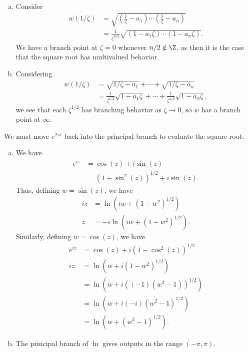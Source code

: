 \documentclass[10pt]{mypackage}
\begin{document}
\begin{solution}[19.18]\hfill
  \begin{enumerate}[(a)]
    \item Consider
      \begin{align*}
        w(1/\zeta) &= \sqrt{\left( \frac{1}{\zeta}-a_1 \right) \cdots \left( \frac{1}{\zeta}-a_n \right)}\\
               &= \frac{1}{\zeta^{n/2}}\sqrt{\left( 1-a_1\zeta \right)\cdots \left( 1-a_n \zeta \right)}.
      \end{align*}
      We have a branch point at $\zeta = 0$ whenever $n/2\notin \Z$, as then it is the case that the square root has multivalued behavior.
    \item Considering
      \begin{align*}
        w\left( 1/\zeta \right) &= \sqrt{1/\zeta - a_1} + \cdots + \sqrt{1/\zeta - a_n}\\
                                &= \frac{1}{\zeta^{1/2}}\sqrt{1-a_1\zeta} + \cdots + \frac{1}{\zeta^{1/2}}\sqrt{1-a_n\zeta},
      \end{align*}
      we see that each $\zeta^{1/2}$ has branching behavior as $ \zeta\rightarrow 0 $, so $w$ has a branch point at $\infty$.
  \end{enumerate}
\end{solution}
\begin{solution}[19.24]
  We must move $e^{2\pi i}$ back into the principal branch to evaluate the square root.
\end{solution}
\begin{solution}[19.28]\hfill
  \begin{enumerate}[(a)]
    \item We have
      \begin{align*}
        e^{iz} &= \cos(z) + i\sin(z)\\
               &= \left( 1-\sin^2(z) \right)^{1/2} + i\sin(z).
      \end{align*}
      Thus, defining $w = \sin(z)$, we have
      \begin{align*}
        iz &= \ln\left( iw + \left( 1- w^2\right)^{1/2} \right)\\
        z &= -i\ln\left( iw + \left( 1-w^2 \right)^{1/2} \right).
      \end{align*}
      Similarly, defining $w = \cos(z)$, we have
      \begin{align*}
        e^{iz} &= \cos(z) + i\left( 1-\cos^2(z) \right)^{1/2}\\
        iz &= \ln\left( w + i\left( 1-w^2 \right)^{1/2} \right)\\
           &= \ln\left( w + i\left( \left( -1 \right)\left( w^2 - 1 \right) \right)^{1/2} \right)\\
           &= \ln\left( w + i\left( -i \right)\left( w^2 - 1 \right)^{1/2} \right)\\
           &= \ln\left( w + \left( w^2 - 1 \right)^{1/2} \right).
      \end{align*}
    \item The principal branch of $\ln$ gives outputs in the range $(-\pi,\pi)$. 
  \end{enumerate}
\end{solution}
\end{document}
